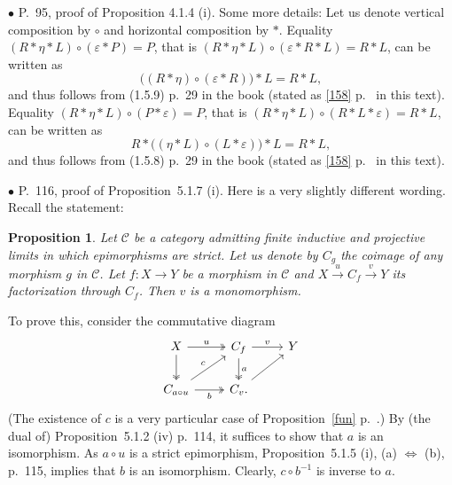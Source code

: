 \documentclass[12pt]{article}
\newtheorem{prop}[thm]{Proposition}
\theoremstyle{remark}%
\newcommand{\bu}{\bullet}
\newcommand{\n}{\noindent}
\newcommand{\C}{\mathcal C}
\newcommand{\e}{\varepsilon}
\newcommand{\pf}{\n{\em Proof. }}
\newcommand{\xr}{\xrightarrow}
\newcommand{\bp}{\begin{prop}}
\newcommand{\ep}{\end{prop}}
\newcommand{\cd}{commutative diagram}
\newcommand{\pr}{Proposition}
\begin{document}

\n$\bu$ P.~95, proof of Proposition 4.1.4 (i). Some more details: Let us denote vertical composition by $\circ$ and horizontal composition by $*$. Equality $(R*\eta*L)\circ(\e*P)=P$, that is $(R*\eta*L)\circ(\e*R*L)=R*L$, can be written as 
$$
\Big((R*\eta)\circ(\e*R)\Big)*L=R*L,
$$ 
and thus follows from (1.5.9) p.~29 in the book (stated as \eqref{158} p.~\pageref{158} in this text). Equality $(R*\eta*L)\circ(P*\e)=P$, that is $(R*\eta*L)\circ(R*L*\e)=R*L$, can be written as 
$$
R*\Big((\eta*L)\circ(L*\e)\Big)*L=R*L,
$$ 
and thus follows from (1.5.8) p.~29 in the book (stated as \eqref{158} p.~\pageref{158} in this text). 


\n$\bu$ P.~116, proof of \pr\ 5.1.7 (i). Here is a very slightly different wording. Recall the statement: 
%
\bp 
Let $\C$ be a category admitting finite inductive and projective limits in which epimorphisms are strict. Let us denote by $C_g$ the coimage of any morphism $g$ in $\C$. Let $f:X\to Y$ be a morphism in $\C$ and $X\xr u C_f\xr v Y$ its factorization through $C_f$. Then $v$ is a monomorphism. 
\ep
%
\pf To prove this, consider the \cd
$$
\begin{tikzcd}
X\ar[two heads]{d}\ar[two heads]{r}{u}&C_f\ar[two heads]{d}{a}\ar{r}{v}&Y\\
C_{a\circ u}\ar{ur}{c}\ar[two heads]{r}[swap]{b}&C_v.\ar{ru}
\end{tikzcd}
$$ 
(The existence of $c$ is a very particular case of \pr\ \ref{fun} p.~\pageref{fun}.) 
By (the dual of) \pr\ 5.1.2 (iv) p.~114, it suffices to show that $a$ is an isomorphism. As $a\circ u$ is a strict epimorphism, \pr\ 5.1.5 (i), (a) $\iff$ (b), p.~115, implies that $b$ is an isomorphism. Clearly, $c\circ b^{-1}$ is inverse to $a$.  

\end{document}
